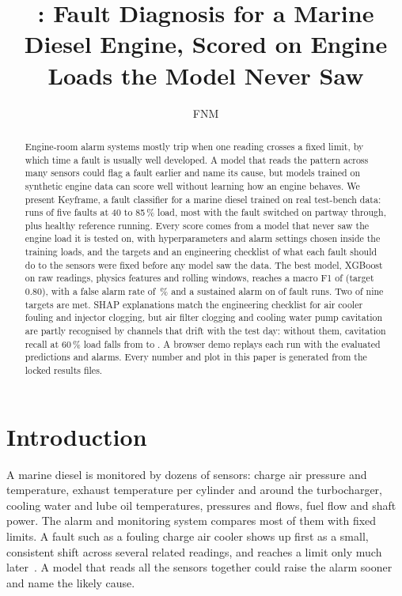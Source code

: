 \documentclass[10pt]{article}
\title{\kf: Fault Diagnosis for a Marine Diesel Engine, Scored on Engine Loads the Model Never Saw}
\author{FNM}
\affiliation{Independent project}
\newcommand{\kf}{Keyframe}
\begin{document}
\maketitle

\begin{abstract}
Engine-room alarm systems mostly trip when one reading crosses a fixed limit, by which time a fault is usually well developed. A model that reads the pattern across many sensors could flag a fault earlier and name its cause, but models trained on synthetic engine data can score well without learning how an engine behaves. We present \kf{}, a fault classifier for a marine diesel trained on real test-bench data: \DataFaultRuns{} runs of five faults at 40 to 85\,\% load, most with the fault switched on partway through, plus healthy reference running. Every score comes from a model that never saw the engine load it is tested on, with hyperparameters and alarm settings chosen inside the training loads, and the targets and an engineering checklist of what each fault should do to the sensors were fixed before any model saw the data. The best model, XGBoost on raw readings, physics features and rolling windows, reaches a macro F1 of \ResFOne{} (target 0.80), with a false alarm rate of \ResFar\,\% and a sustained alarm on \AlarmDetected{} of \AlarmRuns{} fault runs. Two of nine targets are met. SHAP explanations match the engineering checklist for air cooler fouling and injector clogging, but air filter clogging and cooling water pump cavitation are partly recognised by channels that drift with the test day: without them, cavitation recall at 60\,\% load falls from \SensCwBefore{} to \SensCwAfter. A browser demo replays each run with the evaluated predictions and alarms. Every number and plot in this paper is generated from the locked results files.
\end{abstract}

\section{Introduction}

A marine diesel is monitored by dozens of sensors: charge air pressure and temperature, exhaust temperature per cylinder and around the turbocharger, cooling water and lube oil temperatures, pressures and flows, fuel flow and shaft power. The alarm and monitoring system compares most of them with fixed limits. A fault such as a fouling charge air cooler shows up first as a small, consistent shift across several related readings, and reaches a limit only much later~\cite{heywood1988}. A model that reads all the sensors together could raise the alarm sooner and name the likely cause.
\end{document}
